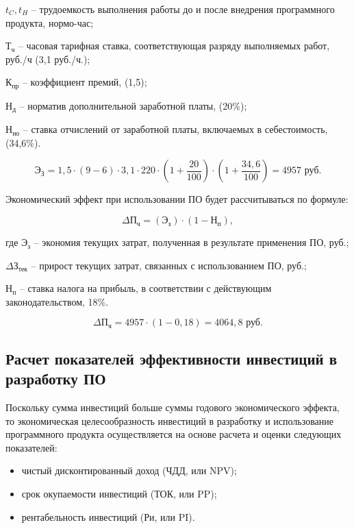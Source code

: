     $t_{C}, t_{H}$ -- трудоемкость выполнения работы до и после внедрения программного продукта, нормо-час; 
    
    $\text{Т}_{\text{ч}}$ -- часовая тарифная ставка, соответствующая разряду выполняемых работ, руб./ч (3,1 руб./ч.); 
    
    $\text{К}_{\text{пр}}$ -- коэффициент премий, (1,5); 
    
    $\text{Н}_{\text{д}}$ -- норматив дополнительной заработной платы, (20\%); 
    
    $\text{Н}_{\text{но}}$ -- ставка отчислений от заработной платы, включаемых в себестоимость, (34,6\%).
 
$$
    \text{Э}_{\text{З}} = 1,5 \cdot (9-6)\cdot 3,1\cdot 220 \cdot  (1+\frac{20}{100})\cdot (1+\frac{34,6}{100}) =  4957 \text{ руб}.
$$
    
Экономический эффект при использовании ПО будет рассчитываться по формуле:

\begin{equation}
    \Delta \text{П}_{\text{ч}} = (\text{Э}_{\text{з}})\cdot (1 - \text{Н}_{\text{п}}), 
\end{equation}

где	$\text{Э}_{\text{з}}$ -- экономия текущих затрат, полученная в результате применения ПО, руб.; 

    $\Delta \text{З}_{\text{тек}}$ -- прирост текущих затрат, связанных с использованием ПО, руб.; 
    
    $\text{Н}_{\text{п}}$ --  ставка налога на прибыль, в соответствии с действующим законодательством, 18\%.

$$
    \Delta \text{П}_{\text{ч}} = 4957\cdot (1 - 0,18) = 4064,8 \text{ руб}.
$$

\subsection{Расчет показателей эффективности инвестиций в разработку ПО}
Поскольку сумма инвестиций больше суммы годового экономического эффекта, то экономическая целесообразность инвестиций в разработку и использование программного продукта осуществляется на основе расчета и оценки следующих показателей: 

\begin{itemize}
    \item чистый  дисконтированный доход (ЧДД, или NPV);
    \item срок окупаемости инвестиций (ТОК, или PP); 
    \item рентабельность инвестиций (Ри, или PI).
\end{itemize}

